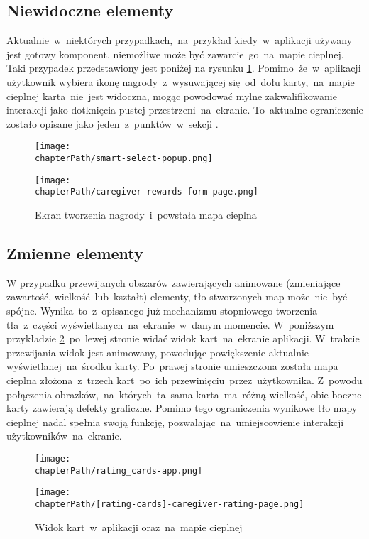 \subsection{Niewidoczne elementy}
Aktualnie~w~niektórych przypadkach,~na~przykład kiedy~w~aplikacji używany jest gotowy komponent, niemożliwe może być zawarcie~go~na~mapie cieplnej. Taki przypadek przedstawiony jest poniżej na rysunku \ref{fig:rs_reward_form}. Pomimo~że~w~aplikacji użytkownik wybiera ikonę nagrody~z~wysuwającej się~od~dołu karty,~na~mapie cieplnej karta~nie~jest widoczna, mogąc powodować mylne zakwalifikowanie interakcji jako dotknięcia pustej przestrzeni~na~ekranie. To~aktualne ograniczenie zostało opisane jako jeden~z~punktów~w~sekcji .

\bigskip
\begin{figure}[H]
\centering
\begin{minipage}{.3\textwidth}
	\centering
	\texttt{[image: \\chapterPath/smart-select-popup.png]}
\end{minipage}
\begin{minipage}{.3\textwidth}
	\centering
	\texttt{[image: \\chapterPath/caregiver-rewards-form-page.png]}
\end{minipage}
\bigskip
\caption{Ekran tworzenia nagrody~i~powstała mapa cieplna}
\label{fig:rs_reward_form}
\end{figure}

\subsection{Zmienne elementy}
W przypadku przewijanych obszarów zawierających animowane (zmieniające zawartość, wielkość~lub~kształt) elementy, tło stworzonych map może~nie~być spójne. Wynika~to~z~opisanego już mechanizmu stopniowego tworzenia tła~z~części wyświetlanych~na~ekranie~w~danym momencie. W~poniższym przykładzie \ref{fig:rs_rating_cards}~po~lewej stronie widać widok kart~na~ekranie aplikacji. W~trakcie przewijania widok jest animowany, powodując powiększenie aktualnie wyświetlanej~na~środku karty. Po~prawej stronie umieszczona została mapa cieplna złożona~z~trzech kart~po~ich przewinięciu~przez~użytkownika. Z~powodu połączenia obrazków,~na~których~ta~sama karta~ma~różną wielkość, obie boczne karty zawierają defekty graficzne. Pomimo tego ograniczenia wynikowe tło mapy cieplnej nadal spełnia swoją funkcję, pozwalając~na~umiejscowienie interakcji użytkowników~na~ekranie.

\bigskip
\begin{figure}[H]
\begin{minipage}{.25\textwidth}
	\centering
	\texttt{[image: \\chapterPath/rating\_cards-app.png]}
\end{minipage}
\begin{minipage}{.74\textwidth}
	\centering
	\texttt{[image: \\chapterPath/[rating-cards]-caregiver-rating-page.png]}
\end{minipage}
\bigskip
\caption{Widok kart~w~aplikacji oraz~na~mapie cieplnej}
\label{fig:rs_rating_cards}
\end{figure}
